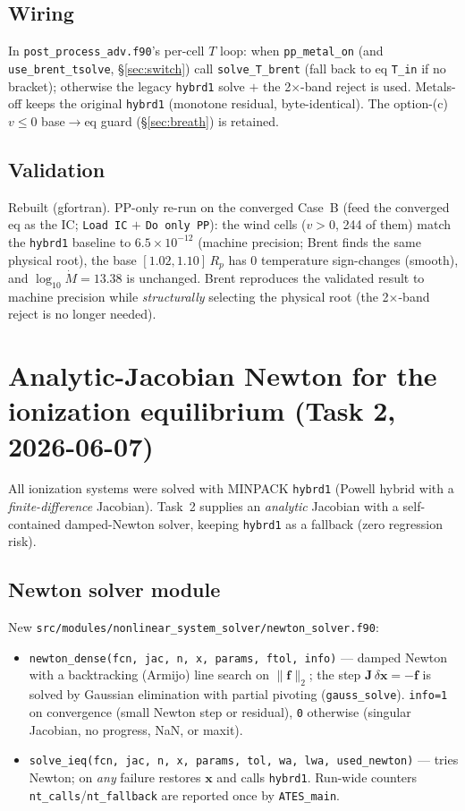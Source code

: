 \documentclass[english,a4paper]{kiseon_memo}
\begin{document}
\subsection{Wiring}
In \texttt{post\_process\_adv.f90}'s per-cell $T$ loop: when \texttt{pp\_metal\_on}
(and \texttt{use\_brent\_tsolve}, \S\ref{sec:switch}) call \texttt{solve\_T\_brent}
(fall back to eq \texttt{T\_in} if no bracket); otherwise the legacy \texttt{hybrd1}
solve $+$ the 2$\times$-band reject is used. Metals-off keeps the original
\texttt{hybrd1} (monotone residual, byte-identical). The option-(c) $v\le0$
base$\to$eq guard (\S\ref{sec:breath}) is retained.

\subsection{Validation}
Rebuilt (gfortran). PP-only re-run on the converged Case~B (feed the converged eq
as the IC; \texttt{Load IC} $+$ \texttt{Do only PP}): the wind cells ($v>0$, 244 of
them) match the \texttt{hybrd1} baseline to \textbf{$6.5\times10^{-12}$} (machine
precision; Brent finds the same physical root), the base $[1.02,1.10]\,R_p$ has 0
temperature sign-changes (smooth), and $\log_{10}\dot M=13.38$ is unchanged. Brent
reproduces the validated result to machine precision while \emph{structurally}
selecting the physical root (the 2$\times$-band reject is no longer needed).

\section{Analytic-Jacobian Newton for the ionization equilibrium (Task 2, 2026-06-07)}\label{sec:task2}
All ionization systems were solved with MINPACK \texttt{hybrd1} (Powell hybrid with
a \emph{finite-difference} Jacobian). Task~2 supplies an \emph{analytic} Jacobian
with a self-contained damped-Newton solver, keeping \texttt{hybrd1} as a fallback
(zero regression risk).

\subsection{Newton solver module}
New \texttt{src/modules/nonlinear\_system\_solver/newton\_solver.f90}:
\begin{itemize}
\item \texttt{newton\_dense(fcn, jac, n, x, params, ftol, info)} --- damped Newton
  with a backtracking (Armijo) line search on $\lVert\mathbf f\rVert_2$; the step
  $\mathbf J\,\delta\mathbf x=-\mathbf f$ is solved by Gaussian elimination with
  partial pivoting (\texttt{gauss\_solve}). \texttt{info=1} on convergence (small
  Newton step or residual), \texttt{0} otherwise (singular Jacobian, no progress,
  NaN, or maxit).
\item \texttt{solve\_ieq(fcn, jac, n, x, params, tol, wa, lwa, used\_newton)} ---
  tries Newton; on \emph{any} failure restores $\mathbf x$ and calls
  \texttt{hybrd1}. Run-wide counters \texttt{nt\_calls}/\texttt{nt\_fallback} are
  reported once by \texttt{ATES\_main}.
\end{itemize}
\end{document}
